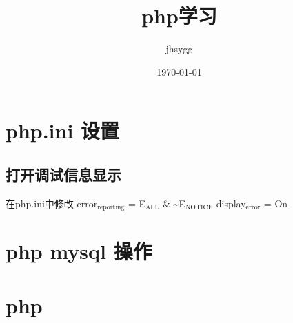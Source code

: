 \documentclass[a4paper]{ctexart}
\title{php学习}
\author{jhsygg}
\date{\today}
\begin{document}
\maketitle

\setcounter{tocdepth}{3}
\tableofcontents
\vspace*{1cm}
\section{php.ini 设置}
\label{sec-1}
\subsection{打开调试信息显示}
\label{sec-1-1}

在php.ini中修改
error$_{\mathrm{reporting}}$ = E$_{\mathrm{ALL}}$ \& \~{}E$_{\mathrm{NOTICE}}$
display$_{\mathrm{error}}$ = On
\section{php mysql 操作}
\label{sec-2}
\section{php}
\label{sec-3}
\end{document}
